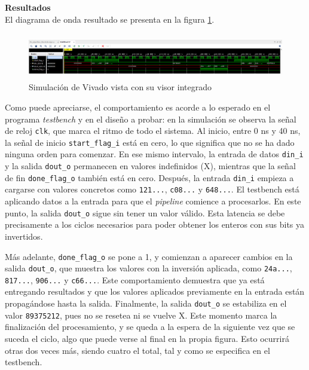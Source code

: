 \begin{adjustwidth}{1.5cm}{}
\textbf{Resultados} \vspace{0.25cm} \\
El diagrama de onda resultado se presenta en la figura \ref{fig:simVivado}.

\begin{figure}[!ht]
  \centering
  \includegraphics[width=15cm, height=2cm]{figures/simVivado.png}
  \caption{Simulación de Vivado vista con su visor integrado}
  \label{fig:simVivado}
\end{figure}

Como puede apreciarse, el comportamiento es acorde a lo esperado en el programa \textit{testbench} y en el diseño a probar: en la simulación se observa la señal de reloj \texttt{clk}, que marca el ritmo de todo el sistema. Al inicio, entre 0 ns y 40 ns, la señal de inicio \texttt{start\_flag\_i} está en cero, lo que significa que no se ha dado ninguna orden para comenzar. En ese mismo intervalo, la entrada de datos \texttt{din\_i} y la salida \texttt{dout\_o} permanecen en valores indefinidos ($\mathrm{X}$), mientras que la señal de fin \texttt{done\_flag\_o} también está en cero. Después, la entrada \texttt{din\_i} empieza a cargarse con valores concretos como \texttt{121...}, \texttt{c08...} y \texttt{648...}. El testbench está aplicando datos a la entrada para que el \textit{pipeline} comience a procesarlos. En este punto, la salida \texttt{dout\_o} sigue sin tener un valor válido. Esta latencia se debe precisamente a los ciclos necesarios para poder obtener los enteros con sus bits ya invertidos.

Más adelante, \texttt{done\_flag\_o} se pone a 1, y comienzan a aparecer cambios en la salida \texttt{dout\_o}, que muestra los valores con la inversión aplicada, como \texttt{24a...}, \texttt{817...}, \texttt{906...} y \texttt{c66...}. Este comportamiento demuestra que ya está entregando resultados y que los valores aplicados previamente en la entrada están propagándose hasta la salida. Finalmente, la salida \texttt{dout\_o} se estabiliza en el valor \texttt{89375212}, pues no se resetea ni se vuelve $\mathrm{X}$. Este momento marca la finalización del procesamiento, y se queda a la espera de la siguiente vez que se suceda el ciclo, algo que puede verse al final en la propia figura. Esto ocurrirá otras dos veces más, siendo cuatro el total, tal y como se especifica en el testbench.
\end{adjustwidth}

